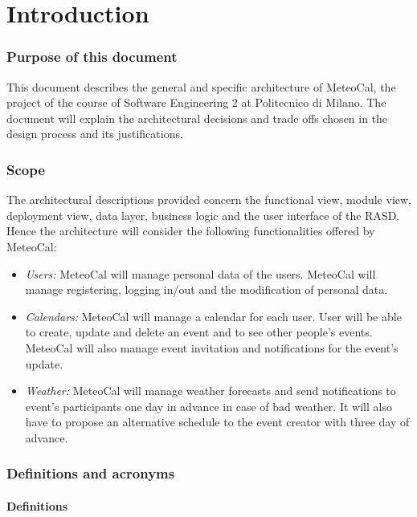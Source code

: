 \documentclass[10pt,a4paper,titlepage]{article}
\begin{document}


\part{Introduction}

\section{Purpose of this document}
This document describes the general and specific architecture of MeteoCal, the project of the course of Software Engineering 2 at Politecnico di Milano.
The document will explain the architectural decisions and trade offs chosen in the design process and its justifications.

\section{Scope}
The architectural descriptions provided concern the functional view, module view, deployment view, data layer, business logic and the user interface of the RASD.
Hence the architecture will consider the following functionalities offered by MeteoCal:

\begin{itemize}
\item \emph{Users:} MeteoCal will manage personal data of the users. MeteoCal will manage registering, logging in/out and the modification of personal data.

\item \emph{Calendars:} MeteoCal will manage a calendar for each user. User will be able to create, update and delete an event and to see other people's events. MeteoCal will also manage event invitation and notifications for the event's update.

\item \emph{Weather:} MeteoCal will manage weather forecasts and send notifications to event's participants one day in advance in case of bad weather. It will also have to propose an alternative schedule to the event creator with three day of advance.
\end{itemize}

\section{Definitions and acronyms}

\subsection{Definitions}
\end{document}

